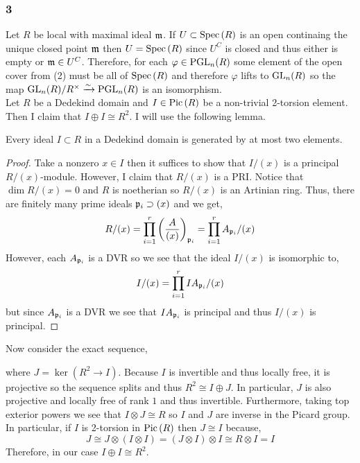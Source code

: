 \documentclass[12pt]{article}
\begin{document}
\subsubsection{3}

Let $R$ be local with maximal ideal $\mathfrak{m}$. If $U \subset \mathrm{Spec}\left( R \right)$ is an open continaing the unique closed point $\mathfrak{m}$ then $U = \mathrm{Spec}\left( R \right)$ since $U^C$ is closed and thus either is empty or $\mathfrak{m} \in U^C$. Therefore, for each $\varphi \in \mathrm{PGL}_n(R)$ some element of the open cover from (2) must be all of $\mathrm{Spec}\left( R \right)$ and therefore $\varphi$ lifts to $\mathrm{GL}_n(R)$ so the map $\mathrm{GL}_n(R) / R^\times \xrightarrow{\sim} \mathrm{PGL}_n(R)$ is an isomorphism.
\bigskip\\
Let $R$ be a Dedekind domain and $I \in \mathrm{Pic} \left( R \right)$ be a non-trivial 2-torsion element. Then I claim that $I \oplus I \cong R^2$. I will use the following lemma.

\begin{lemma}
Every ideal $I \subset R$ in a Dedekind domain is generated by at most two elements. 
\end{lemma}

\begin{proof}
Take a nonzero $x \in I$ then it suffices to show that $I/(x)$ is a principal $R/(x)$-module. However, I claim that $R/(x)$ is a PRI. Notice that $\dim{R/(x)} = 0$ and $R$ is noetherian so $R/(x)$ is an Artinian ring. Thus, there are finitely many prime ideals $\mathfrak{p}_i \supset (x)$ and we get,
\[ R / (x) = \prod_{i = 1}^r \left( \frac{A}{(x)} \right)_{\mathfrak{p}_i} = \prod_{i = 1}^r A_{\mathfrak{p}_i}/(x) \]
However, each $A_{\mathfrak{p}_i}$ is a DVR so we see that the ideal $I/(x)$ is isomorphic to,
\[ I/(x) = \prod_{i = 1}^r I A_{\mathfrak{p}_i} / (x) \]
but since $A_{\mathfrak{p}_i}$ is a DVR we see that $I A_{\mathfrak{p}_i}$ is principal and thus $I/(x)$ is principal.
\end{proof}
\noindent
Now consider the exact sequence,
\begin{center}
\end{center}
where $J = \ker{(R^2 \to I)}$. Because $I$ is invertible and thus locally free, it is projective so the sequence splits and thus $R^2 \cong I \oplus J$. In particular, $J$ is also projective and locally free of rank $1$ and thus invertible. Furthermore, taking top exterior powers we see that $I \otimes J \cong R$ so $I$ and $J$ are inverse in the Picard group. In particular, if $I$ is 2-torsion in $\mathrm{Pic} \left( R \right)$ then $J \cong I$ because,
\[ J \cong J \otimes (I \otimes I) = (J \otimes I) \otimes I \cong R \otimes I = I \]
Therefore, in our case $I \oplus I \cong R^2$. 
\end{document}
